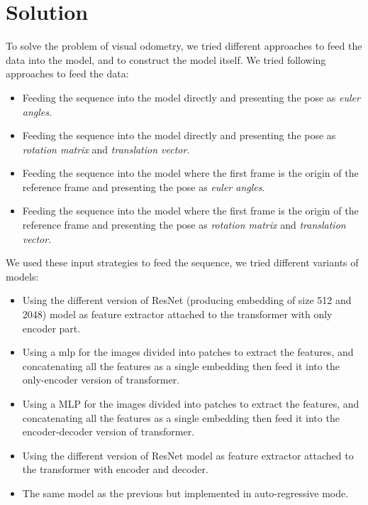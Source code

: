 
\section{Solution}\label{sec:solution}
To solve the problem of visual odometry, we tried different approaches to feed the data into the model, and to construct the model itself.
We tried following approaches to feed the data:
\begin{itemize}
    \item Feeding the sequence into the model directly and presenting the pose as \emph{euler angles}.
    \item Feeding the sequence into the model directly and presenting the pose as \emph{rotation matrix} and \emph{translation vector}.
    \item Feeding the sequence into the model where the first frame is the origin of the reference frame and presenting the pose as \emph{euler angles}.
    \item Feeding the sequence into the model where the first frame is the origin of the reference frame and presenting the pose as \emph{rotation matrix} and \emph{translation vector}.
\end{itemize}

We used these input strategies to feed the sequence, we tried different variants of models:
\begin{itemize}
    \item Using the different version of ResNet (producing \gls{embedding} of size 512 and 2048) model as feature extractor attached to the transformer with only encoder part.
    \item Using a \gls{mlp} for the images divided into patches to extract the features, and concatenating all the features as a single embedding then feed it into the only-encoder version of transformer.
    \item Using a MLP for the images divided into patches to extract the features, and concatenating all the features as a single embedding then feed it into the encoder-decoder version of transformer.
    \item Using the different version of ResNet model as feature extractor attached to the transformer with encoder and decoder.
    \item The same model as the previous but implemented in \gls{auto-regressive} mode.
\end{itemize}